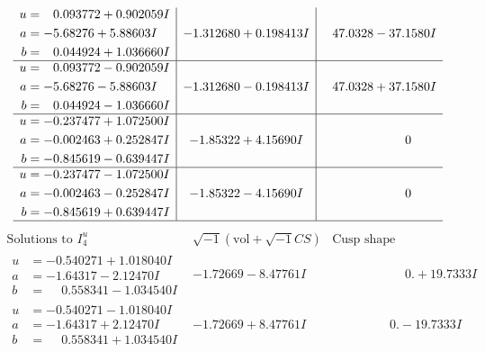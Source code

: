 \documentclass[1p]{elsarticle_modified}
\theoremstyle{definition}
\newcommand{\I}{\sqrt{-1}}
\begin{document}
$$\begin{array}{c|c|c}
\begin{aligned}
u &= \phantom{-}0.093772 + 0.902059 I \\
a &= -5.68276 + 5.88603 I \\
b &= \phantom{-}0.044924 + 1.036660 I\end{aligned}
 & -1.312680 + 0.198413 I & \phantom{-}47.0328 - 37.1580 I \\ \hline\begin{aligned}
u &= \phantom{-}0.093772 - 0.902059 I \\
a &= -5.68276 - 5.88603 I \\
b &= \phantom{-}0.044924 - 1.036660 I\end{aligned}
 & -1.312680 - 0.198413 I & \phantom{-}47.0328 + 37.1580 I \\ \hline\begin{aligned}
u &= -0.237477 + 1.072500 I \\
a &= -0.002463 + 0.252847 I \\
b &= -0.845619 - 0.639447 I\end{aligned}
 & -1.85322 + 4.15690 I & \phantom{-0.000000 } 0 \\ \hline\begin{aligned}
u &= -0.237477 - 1.072500 I \\
a &= -0.002463 - 0.252847 I \\
b &= -0.845619 + 0.639447 I\end{aligned}
 & -1.85322 - 4.15690 I & \phantom{-0.000000 } 0\\
 \hline 
 \end{array}$$\newpage$$\begin{array}{c|c|c}  
\text{Solutions to }I^u_{4}& \I (\text{vol} + \sqrt{-1}CS) & \text{Cusp shape}\\
 \hline 
\begin{aligned}
u &= -0.540271 + 1.018040 I \\
a &= -1.64317 - 2.12470 I \\
b &= \phantom{-}0.558341 - 1.034540 I\end{aligned}
 & -1.72669 - 8.47761 I & \phantom{-0.000000 -}0. + 19.7333 I \\ \hline\begin{aligned}
u &= -0.540271 - 1.018040 I \\
a &= -1.64317 + 2.12470 I \\
b &= \phantom{-}0.558341 + 1.034540 I\end{aligned}
 & -1.72669 + 8.47761 I & \phantom{-0.000000 } 0. - 19.7333 I \\ \hline\begin{aligned}

\end{aligned}
\end{array}$$
\end{document}
